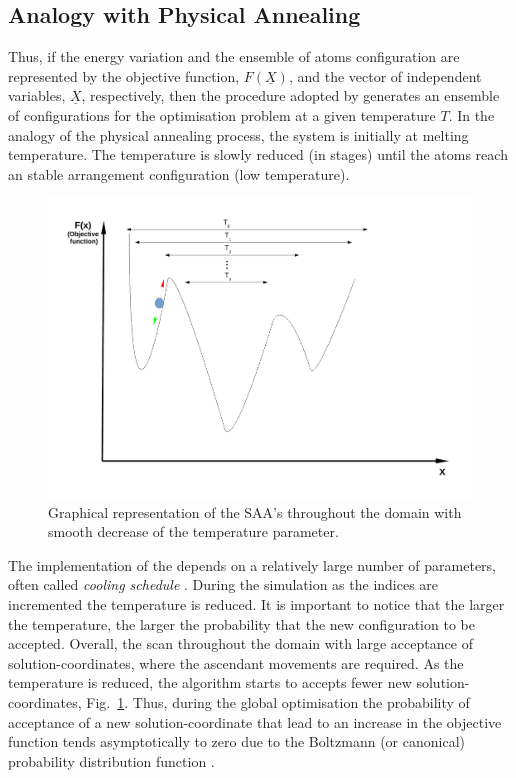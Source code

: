 \subsection{Analogy with Physical Annealing}
Thus, if the energy variation and  the ensemble of atoms configuration are represented by the objective function, $F\left(\underline{X}\right)$, and the vector of independent variables, $\underline{X}$, respectively, then the procedure adopted by \citet{Metropolis_1953} generates an ensemble of configurations for the optimisation problem at a given temperature $T$. In the analogy of the physical annealing process, the system is initially at melting temperature. The temperature is slowly reduced (\ie in stages) until the atoms reach an stable arrangement configuration (\ie low temperature). 
\begin{figure}[h]
          \includegraphics[width=\columnwidth,clip]{./Figs/SimulatedAnnealingAlgorithmTemperature}
           \caption{Graphical representation of the SAA's throughout the domain with smooth decrease of the temperature parameter.} 
\label{Chapter:GlobalOpt:Fig:SimulatedAnnealingAlgorithmTemperature}
\end{figure}
The implementation of the \SAA depends on a relatively large number of parameters, often called {\it cooling schedule} \citep[see][for a good review]{Nourani_1998}. During the \SAA simulation as the indices are incremented the temperature is reduced. It is important to notice that the larger the temperature, the larger the probability that the new configuration to be accepted. Overall, the \SAA scan throughout the domain with large acceptance of solution-coordinates, where the ascendant movements are required. As the temperature is reduced, the algorithm starts to accepts fewer new solution-coordinates, Fig.~\ref{Chapter:GlobalOpt:Fig:SimulatedAnnealingAlgorithmTemperature}. Thus, during the global optimisation the probability of acceptance of a new solution-coordinate that lead to an increase in the objective function tends asymptotically to zero due to the Boltzmann (or canonical) probability distribution function \citep{Tsallis_1996,Dekkers_1991}.


